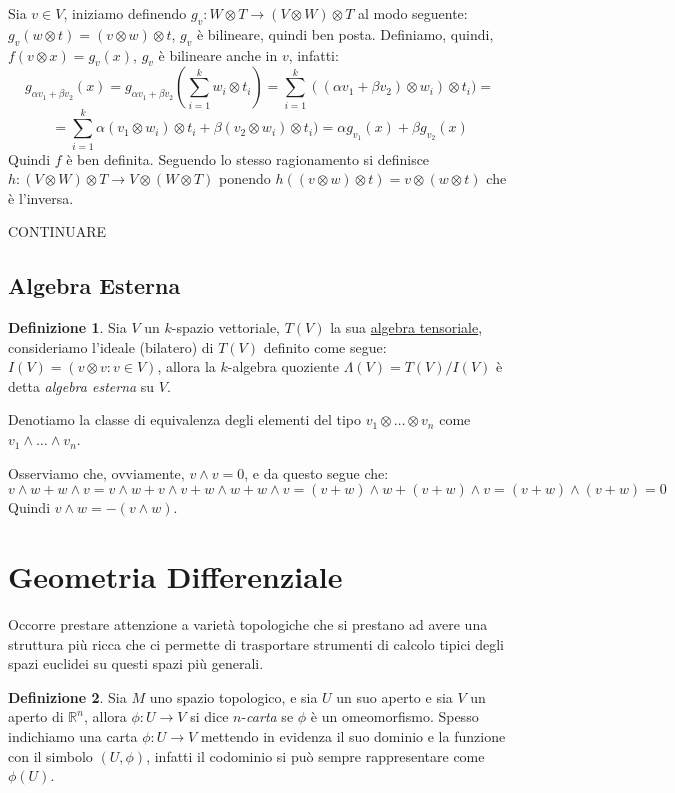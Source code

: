 \documentclass[12pt, a4paper]{article}
\theoremstyle{definition}
\newtheorem{defi}{Definizione}
\begin{document}
Sia $v \in V$, iniziamo definendo $g_v : W \otimes T \to (V \otimes W) \otimes T$ al modo seguente: $g_v(w \otimes t) = (v \otimes w) \otimes t$, $g_v$ è bilineare, quindi ben posta.
Definiamo, quindi, $f(v \otimes x) = g_v(x)$, $g_v$ è bilineare anche in $v$, infatti:
$$g_{\alpha v_1 + \beta v_2}(x) = g_{\alpha v_1 + \beta v_2}(\sum\limits_{i = 1}^k w_i \otimes t_i) = \sum\limits_{i = 1}^k ((\alpha v_1 + \beta v_2) \otimes w_i)  \otimes t_i)=$$
$$=\sum\limits_{i = 1}^k \alpha (v_1 \otimes w_i) \otimes t_i + \beta (v_2 \otimes w_i) \otimes t_i) = \alpha g_{v_1}(x) + \beta g_{v_2}(x)$$
Quindi $f$ è ben definita.
Seguendo lo stesso ragionamento si definisce $h : (V \otimes W) \otimes T \to V \otimes (W \otimes T)$ ponendo $h((v \otimes w) \otimes t) = v \otimes (w \otimes t)$ che è l'inversa.

CONTINUARE

\subsection{Algebra Esterna} \label{sec:algebra-esterna}

\begin{defi} \label{def:algebra-esterna}
Sia $V$ un $k$-spazio vettoriale, $T(V)$ la sua \hyperref[def:algebra-tensoriale]{algebra tensoriale}, consideriamo l'ideale (bilatero) di $T(V)$ definito come segue: $I(V) = ( v \otimes v : v \in V )$, allora
la $k$-algebra quoziente $\Lambda(V) = T(V) / I(V)$ è detta \emph{algebra esterna} su $V$.

Denotiamo la classe di equivalenza degli elementi del tipo $v_1 \otimes \ldots \otimes v_n$ come $v_1 \wedge \ldots \wedge v_n$.
\end{defi}

Osserviamo che, ovviamente, $v \wedge v = 0$, e da questo segue che:
$$v \wedge w + w \wedge v = v \wedge w + v \wedge v + w \wedge w + w \wedge v = (v + w) \wedge w + (v + w) \wedge v = (v + w) \wedge (v + w) = 0$$
Quindi $v \wedge w = - (v \wedge w)$.

\section{Geometria Differenziale}
Occorre prestare attenzione a varietà topologiche che si prestano ad avere una struttura più ricca che ci permette di trasportare strumenti di calcolo tipici degli spazi euclidei
su questi spazi più generali.

\begin{defi} \label{def:carta}
Sia $M$ uno spazio topologico, e sia $U$ un suo aperto e sia $V$ un aperto di $\mathbb{R}^n$, allora $\phi : U \to V$ si dice $n$-\emph{carta} se $\phi$ è un omeomorfismo.
Spesso indichiamo una carta $\phi : U \to V$ mettendo in evidenza il suo dominio e la funzione con il simbolo $(U, \phi)$, infatti il codominio si può sempre rappresentare come $\phi(U)$.
\end{defi}
\end{document}
